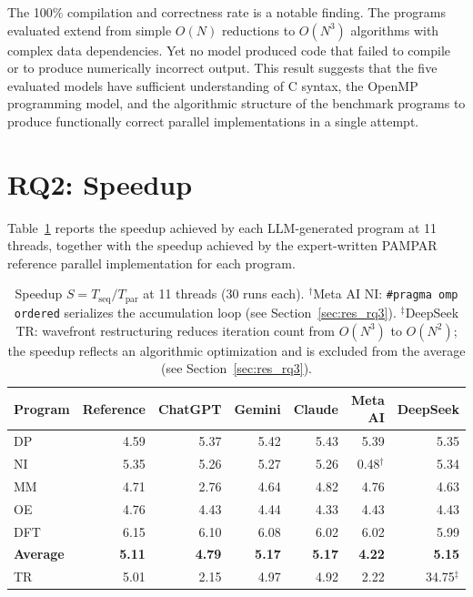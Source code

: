 The 100\% compilation and correctness rate is a notable finding. 
The programs evaluated extend from simple $O(N)$ reductions to $O(N^3)$ algorithms with complex data dependencies. 
Yet no model produced code that failed to compile or to produce numerically incorrect output. 
This result suggests that the five evaluated models have sufficient understanding of C syntax, the OpenMP programming model, and the algorithmic structure of the benchmark programs to produce functionally correct parallel implementations in a single attempt.

\section{RQ2: Speedup}
\label{sec:res_rq2}

Table~\ref{tab:speedup} reports the speedup achieved by each LLM-generated program at 11 threads, together with the speedup achieved by the expert-written PAMPAR reference parallel implementation for each program.

\begin{table}[htbp]
\centering
\caption{Speedup $S = T_{\text{seq}} / T_{\text{par}}$ at 11 threads (30 runs each). 
$^\dagger$Meta AI NI: \texttt{\#pragma omp ordered} serializes the accumulation loop (see Section~\ref{sec:res_rq3}). 
$^\ddagger$DeepSeek TR: wavefront restructuring reduces iteration count from $O(N^3)$ to $O(N^2)$; the speedup reflects an algorithmic optimization and is excluded from the average (see Section~\ref{sec:res_rq3}).} 
\label{tab:speedup}
\begin{tabular}{lrrrrrr}
\toprule
\textbf{Program} & \textbf{Reference} & \textbf{ChatGPT} & \textbf{Gemini} & \textbf{Claude} & \textbf{Meta AI} & \textbf{DeepSeek} \\
\midrule
DP  & 4.59 & 5.37 & 5.42 & 5.43 & 5.39 & 5.35 \\
NI  & 5.35 & 5.26 & 5.27 & 5.26 & 0.48$^\dagger$ & 5.34 \\
MM  & 4.71 & 2.76 & 4.64 & 4.82 & 4.76 & 4.63 \\
OE  & 4.76 & 4.43 & 4.44 & 4.33 & 4.43 & 4.43 \\
DFT & 6.15 & 6.10 & 6.08 & 6.02 & 6.02 & 5.99 \\
\midrule
\textbf{Average} &
\textbf{5.11} & \textbf{4.79} & \textbf{5.17} & \textbf{5.17} & \textbf{4.22} & \textbf{5.15} \\
\midrule
TR  & 5.01 & 2.15 & 4.97 & 4.92 & 2.22 & 34.75$^\ddagger$ \\
\bottomrule
\end{tabular}
\end{table}

